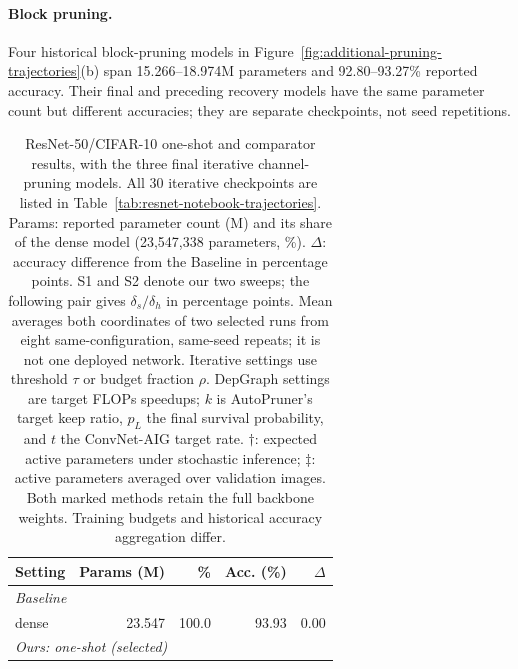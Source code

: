 \paragraph{Block pruning.}
Four historical block-pruning models in Figure~\ref{fig:additional-pruning-trajectories}(b) span 15.266--18.974M parameters and 92.80--93.27\%
reported accuracy. Their final and preceding recovery models
have the same parameter count but different accuracies;
they are separate checkpoints, not seed repetitions.


\begin{table}[t]
  \caption{ResNet-50/CIFAR-10 one-shot and comparator results, with the three
    final iterative channel-pruning models. All 30 iterative checkpoints
    are listed in Table~\ref{tab:resnet-notebook-trajectories}. Params: reported parameter
    count (M) and its share of the dense model (23{,}547{,}338 parameters,
    \%). $\Delta$: accuracy difference from the Baseline in percentage
    points. S1 and S2 denote our two sweeps; the following pair gives
    $\delta_s/\delta_h$ in percentage points. Mean averages both
    coordinates of two selected runs from eight same-configuration,
    same-seed repeats; it is not one deployed network.
    Iterative settings use threshold $\tau$ or budget fraction $\rho$.
    DepGraph settings are target FLOPs speedups; $k$ is AutoPruner's
    target keep ratio, $p_L$ the final survival probability, and $t$
    the ConvNet-AIG target rate. $\dagger$: expected active parameters
    under stochastic inference; $\ddagger$: active parameters averaged
    over validation images. Both marked methods retain the full backbone
    weights. Training budgets and historical accuracy aggregation differ.}
  \label{tab:resnet-cifar-all}
  \centering
  \small
  \setlength{\tabcolsep}{4pt}
  \begin{minipage}[t]{0.48\textwidth}
    \centering
    \begin{tabular}[t]{@{}lrrrr@{}}
      \toprule
      Setting & Params (M) & \% & Acc. (\%) & $\Delta$ \\
      \midrule
      \multicolumn{5}{l}{\textit{Baseline}} \\
      dense & 23.547 & 100.0 & 93.93 & 0.00 \\
      \midrule
      \multicolumn{5}{l}{\textit{Ours: one-shot (selected)}} \\

\end{tabular}
\end{minipage}
\end{table}

